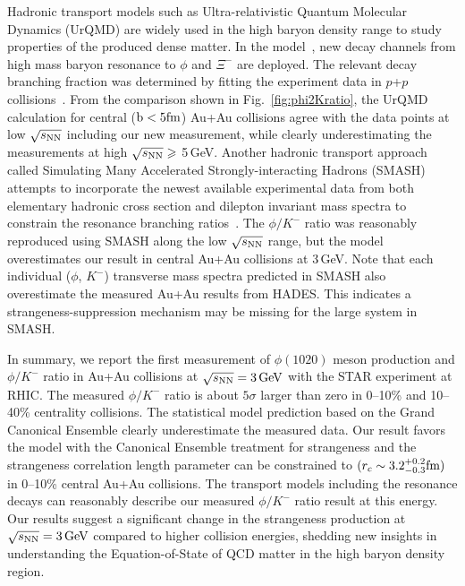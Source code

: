 \documentclass[%
 reprint,	
showpacs,
 amsmath,amssymb,
 aps,
 prc,
]{revtex4-1}
\begin{document}
Hadronic transport models such as Ultra-relativistic Quantum Molecular Dynamics (UrQMD) are widely used in the high baryon density range to study properties of the produced dense matter. In the model~\cite{Steinheimer_2015_UrQMD}, new decay channels from high mass baryon resonance to $\phi$ and $\Xi^-$ are deployed. The relevant decay branching fraction was determined by fitting the experiment data in $p$+$p$ collisions~\cite{ANKE_phi}. From the comparison shown in Fig.~\ref{fig:phi2Kratio}, the UrQMD calculation for central ($\rm{b}<5\rm{fm}$) Au+Au collisions agree with the data points at low ${\sqrt{s_{\rm NN}}}$ including our new measurement, while clearly underestimating the measurements at high $\sqrt{s_{\rm NN}}\geqslant$ 5\,GeV. Another hadronic transport approach called Simulating Many Accelerated Strongly-interacting Hadrons (SMASH) attempts to incorporate the newest available experimental data from both elementary hadronic cross section and dilepton invariant mass spectra to constrain the resonance branching ratios~\cite{Elfner_SMASH}. The $\phi/K^-$ ratio was reasonably reproduced using SMASH along the low ${\sqrt{s_{\rm NN}}}$ range, but the model overestimates our result in central Au+Au collisions at 3\,GeV. Note that each individual ($\phi$, $K^-$) transverse mass spectra predicted in SMASH also overestimate the measured Au+Au results from HADES.
This indicates a strangeness-suppression mechanism may be missing for the large system in SMASH.

In summary, we report the first measurement of $\phi(1020)$ meson production and $\phi/K^-$ ratio in Au+Au collisions at ${\sqrt{s_{\rm NN}} = \rm{3\,GeV}}$ with the STAR experiment at RHIC. The measured $\phi/K^-$ ratio is about $5\sigma$ larger than zero in 0--10\% and 10--40\% centrality collisions. The statistical model prediction based on the Grand Canonical Ensemble clearly underestimate the measured data. Our result favors the model with the Canonical Ensemble treatment for strangeness and the strangeness correlation length parameter can be constrained to $(r_c \sim 3.2_{-0.3}^{+0.2} \rm{fm})$ in 0--10\% central Au+Au collisions. The transport models including the resonance decays can reasonably describe our measured $\phi/K^-$ ratio result at this energy. Our results suggest a significant change in the strangeness production at ${\sqrt{s_{\rm NN}} = \rm{3\,GeV}}$ compared to higher collision energies, shedding new insights in understanding the Equation-of-State of QCD matter in the high baryon density region. 
\end{document}
